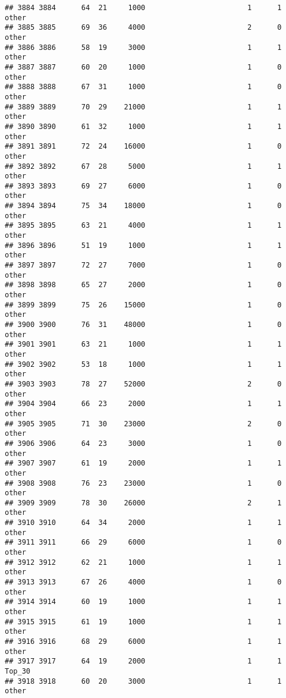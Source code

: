 \documentclass[
]{article}
\begin{document}
\begin{verbatim}
## 3884 3884      64  21     1000                        1      1    other
## 3885 3885      69  36     4000                        2      0    other
## 3886 3886      58  19     3000                        1      1    other
## 3887 3887      60  20     1000                        1      0    other
## 3888 3888      67  31     1000                        1      0    other
## 3889 3889      70  29    21000                        1      1    other
## 3890 3890      61  32     1000                        1      1    other
## 3891 3891      72  24    16000                        1      0    other
## 3892 3892      67  28     5000                        1      1    other
## 3893 3893      69  27     6000                        1      0    other
## 3894 3894      75  34    18000                        1      0    other
## 3895 3895      63  21     4000                        1      1    other
## 3896 3896      51  19     1000                        1      1    other
## 3897 3897      72  27     7000                        1      0    other
## 3898 3898      65  27     2000                        1      0    other
## 3899 3899      75  26    15000                        1      0    other
## 3900 3900      76  31    48000                        1      0    other
## 3901 3901      63  21     1000                        1      1    other
## 3902 3902      53  18     1000                        1      1    other
## 3903 3903      78  27    52000                        2      0    other
## 3904 3904      66  23     2000                        1      1    other
## 3905 3905      71  30    23000                        2      0    other
## 3906 3906      64  23     3000                        1      0    other
## 3907 3907      61  19     2000                        1      1    other
## 3908 3908      76  23    23000                        1      0    other
## 3909 3909      78  30    26000                        2      1    other
## 3910 3910      64  34     2000                        1      1    other
## 3911 3911      66  29     6000                        1      0    other
## 3912 3912      62  21     1000                        1      1    other
## 3913 3913      67  26     4000                        1      0    other
## 3914 3914      60  19     1000                        1      1    other
## 3915 3915      61  19     1000                        1      1    other
## 3916 3916      68  29     6000                        1      1    other
## 3917 3917      64  19     2000                        1      1   Top_30
## 3918 3918      60  20     3000                        1      1    other

\end{verbatim}
\end{document}
